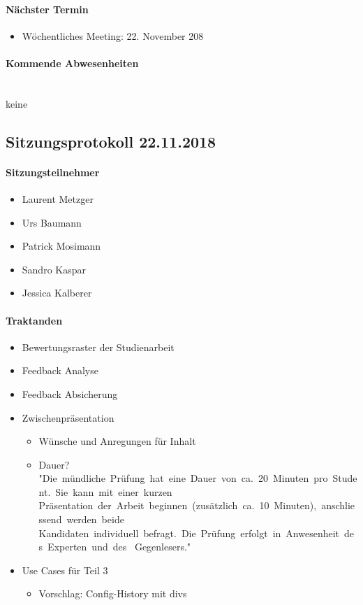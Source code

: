 \paragraph{Nächster Termin}
\begin{itemize}	
	\item Wöchentliches Meeting: 22. November 208
\end{itemize}

\paragraph{Kommende Abwesenheiten} \mbox{}\\
keine








\subsection{Sitzungsprotokoll 22.11.2018}

\paragraph{Sitzungsteilnehmer}
\begin{itemize}	
	\item Laurent Metzger
	\item Urs Baumann
	\item Patrick Mosimann
	\item Sandro Kaspar
	\item Jessica Kalberer
\end{itemize}

\paragraph{Traktanden}
\begin{itemize}	
	\item Bewertungsraster der Studienarbeit
	\item Feedback Analyse
	\item Feedback Absicherung
	\item Zwischenpräsentation 
	\begin{itemize}
		\item Wünsche und Anregungen für Inhalt
		\item Dauer? "Die mündliche Prüfung hat eine Dauer von ca. 20 Minuten pro Student. Sie kann mit einer kurzen 
		Präsentation der Arbeit beginnen (zusätzlich ca. 10 Minuten), anschliessend werden beide 
		Kandidaten individuell befragt. Die Prüfung erfolgt in Anwesenheit des Experten und des 
		Gegenlesers."
	\end{itemize}
	\item Use Cases für Teil 3
	\begin{itemize}
		\item Vorschlag: Config-History mit divs
	\end{itemize}
\end{itemize}

